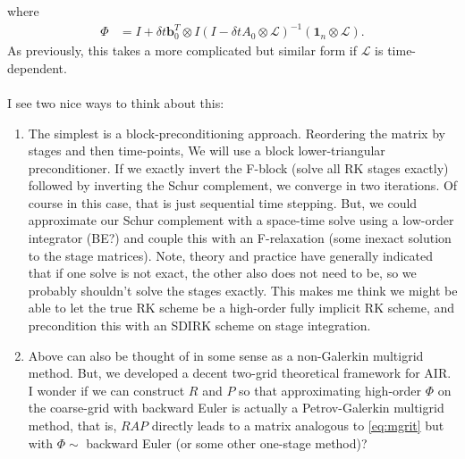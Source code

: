 \documentclass[a4paper,10pt]{article}
\begin{document}
%
where
%
\begin{align}\label{eq:mgrit}
\Phi & = I + \delta t\mathbf{b}_0^T\otimes I \left(I - \delta t A_0\otimes \mathcal{L}\right)^{-1} (\mathbf{1}_n \otimes \mathcal{L}).
\end{align}
%
As previously, this takes a more complicated but similar form if $\mathcal{L}$ is
time-dependent.\\
\\
I see two nice ways to think about this:
%
\begin{enumerate}
	\item The simplest is a block-preconditioning approach. Reordering the matrix by stages
	and then time-points, We will use a block lower-triangular preconditioner. If we exactly
	invert the F-block (solve all RK stages exactly) followed by inverting the Schur complement,
	we converge in two iterations. Of course in this case, that is just sequential time stepping.
	But, we could approximate our Schur complement with a space-time solve using a low-order 
	integrator (BE?) and couple this with an F-relaxation (some inexact solution to the
	stage matrices). Note, theory and practice have generally indicated that if one solve is
	not exact, the other also does not need to be, so we probably shouldn't solve the stages
	exactly. This makes me think we might be able to let the true RK scheme be a high-order
	fully implicit RK scheme, and precondition this with an SDIRK scheme on stage integration.

	\item Above can also be thought of in some sense as a non-Galerkin multigrid method.
	But, we developed a decent two-grid theoretical framework for AIR. I wonder if we can
	construct $R$ and $P$ so that approximating high-order $\Phi$ on the coarse-grid with
	backward Euler is actually a Petrov-Galerkin multigrid method, that is, $RAP$ directly
	leads to a matrix analogous to \eqref{eq:mgrit} but with $\Phi\sim$ backward Euler
	(or some other one-stage method)?

\end{enumerate}
\end{document}
